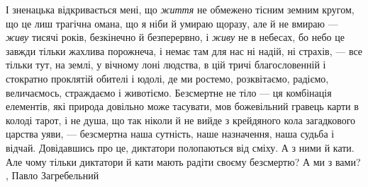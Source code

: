 І зненацька відкривається мені, що \emph{життя} не обмежено тісним земним
кругом, що це лиш трагічна омана, що я ніби й умираю щоразу, але й не вмираю —
\emph{живу} тисячі років, безкінечно й безперервно, і \emph{живу} не в небесах,
бо небо це завжди тільки жахлива порожнеча, і немає там для нас ні надій, ні
страхів, — все тільки тут, на землі, у вічному лоні людства, в цій тричі
благословенній і стократно проклятій обителі і юдолі, де ми ростемо,
розквітаємо, радіємо, величаємось, страждаємо і животіємо.  Безсмертне не тіло
— ця комбінація елементів, які природа довільно може тасувати, мов божевільний
гравець карти в колоді тарот, і не душа, що так ніколи й не вийде з крейдяного
кола загадкового царства уяви, — безсмертна наша сутність, наше назначення,
наша судьба і відчай.  Довідавшись про це, диктатори полопаються від сміху. А з
ними й кати.  Але чому тільки диктатори й кати мають радіти своєму безсмертю? А
ми з вами?
, Павло Загребельний 

